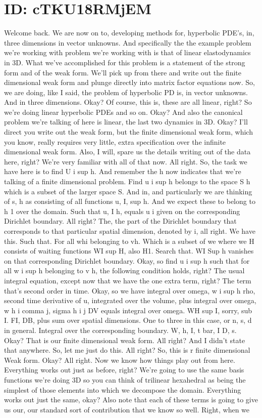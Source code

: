 \documentclass[10pt]{article}
\begin{document}
\section*{ID: cTKU18RMjEM}
Welcome back. We are now on to, developing methods for, hyperbolic PDE's, in, three dimensions in vector unknowns. And specifically the the example problem we're working with problem we're working with is that of linear elastodynamics in 3D. What we've accomplished for this problem is a statement of the strong form and of the weak form. We'll pick up from there and write out the finite dimensional weak form and plunge directly into matrix factor equations now. So, we are doing, like I said, the problem of hyperbolic PD is, in vector unknowns. And in three dimensions. Okay? Of course, this is, these are all linear, right? So we're doing linear hyperbolic PDEs and so on. Okay? And also the canonical problem we're talking of here is linear, the last two dynamics in 3D. Okay? I'll direct you write out the weak form, but the finite dimensional weak form, which you know, really requires very little, extra specification over the infinite dimensional weak form. Also, I will, spare us the details writing out of the data here, right? We're very familiar with all of that now. All right. So, the task we have here is to find U i sup h. And remember the h now indicates that we're talking of a finite dimensional problem. Find u i sup h belongs to the space S h which is a subset of the larger space S. And in, and particularly we are thinking of s, h as consisting of all functions u, I, sup h. And we expect these to belong to h 1 over the domain. Such that u, I h, equals u i given on the corresponding Dirichlet boundary. All right? The, the part of the Dirichlet boundary that corresponds to that particular spatial dimension, denoted by i, all right. We have this. Such that. For all whi belonging to vh. Which is a subset of we where we H consists of waiting functions WI sup H, also H1. Search that. WI Sup h vanishes on that corresponding Dirichlet boundary. Okay, so find u i sup h such that for all w i sup h belonging to v h, the following condition holds, right? The usual integral equation, except now that we have the one extra term, right? The term that's second order in time. Okay, so we have integral over omega, w i sup h rho, second time derivative of u, integrated over the volume, plus integral over omega, w h i comma j, sigma h i j DV equals integral over omega. WH sup I, sorry, sub I. FI, DB, plus sum over spatial dimensions. One to three in this case, or n, s, d in general. Integral over the corresponding boundary. W, h, I, t bar, I D, s. Okay? That is our finite dimensional weak form. All right? And I didn't state that anywhere. So, let me just do this. All right? So, this is r finite dimensional Weak form. Okay? All right. Now we know how things play out from here. Everything works out just as before, right? We're going to use the same basis functions we're doing 3D so you can think of trilinear hexahedral as being the simplest of those elements into which we decompose the domain. Everything works out just the same, okay? Also note that each of these terms is going to give us our, our standard sort of contribution that we know so well. Right, when we 
\end{document}
